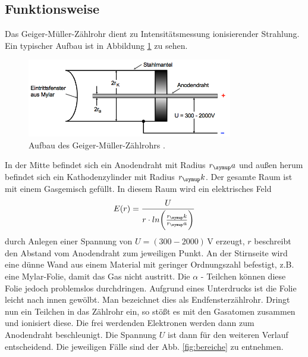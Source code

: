 \subsection{Funktionsweise}
Das Geiger-Müller-Zählrohr dient zu Intensitätsmessung ionisierender Strahlung.
Ein typischer Aufbau ist in Abbildung \ref{fig:aufbau} zu sehen.
\begin{figure}
  \centering
  \includegraphics[width=0.8\textwidth]{bilder/aufbau.png}
  \caption{Aufbau des Geiger-Müller-Zählrohrs \cite{703}.
  \label{fig:aufbau}}
\end{figure}
In der Mitte befindet sich ein Anodendraht mit Radius $r_\su{a}$ und außen herum
befindet sich ein Kathodenzylinder mit Radius $r_\su{k}$. Der gesamte Raum ist mit
einem Gasgemisch gefüllt. In diesem Raum wird ein elektrisches Feld
\begin{equation}
  E(r)= \frac{U}{r \cdot ln \bigg( \frac{r_\su{k}}{r_\su{a}}\bigg)}
\end{equation}
durch Anlegen einer Spannung von $U = (300-2000) \,\si{\volt}$ erzeugt, $r$
beschreibt den Abstand vom Anodendraht zum jeweiligen Punkt.
An der Stirnseite wird eine dünne Wand aus einem Material mit geringer Ordnungszahl
befestigt, z.B. eine Mylar-Folie, damit das Gas nicht austritt. Die $\alpha$ - Teilchen
können diese Folie jedoch problemslos durchdringen. Aufgrund eines Unterdrucks ist
die Folie leicht nach innen gewölbt. Man bezeichnet dies als Endfensterzählrohr.
Dringt nun ein Teilchen in das Zählrohr ein, so stößt es mit den Gasatomen zusammen
und ionisiert diese. Die frei werdenden Elektronen werden dann zum Anodendraht
beschleunigt. Die Spannung $U$ ist dann für den weiteren Verlauf entscheidend.
Die jeweiligen Fälle sind der Abb. \ref{fig:bereiche}
zu entnehmen.
